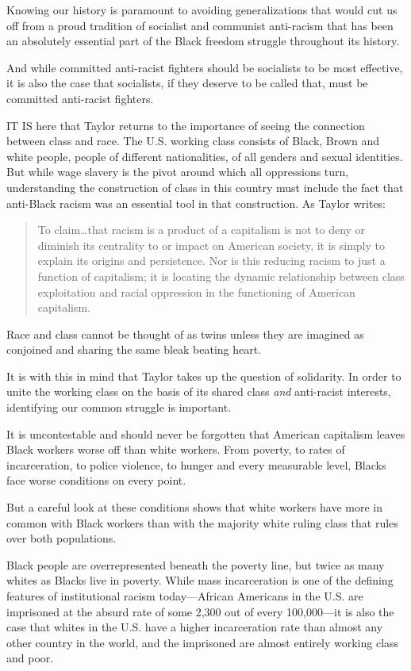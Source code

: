 Knowing our history is paramount to avoiding generalizations that would cut us off from a proud tradition of socialist and communist anti-racism that has been an absolutely essential part of the Black freedom struggle throughout its history.

And while committed anti-racist fighters should be socialists to be most effective, it is also the case that socialists, if they deserve to be called that, must be committed anti-racist fighters.

\sectiondivider

IT IS here that Taylor returns to the importance of seeing the connection between class and race. The U.S. working class consists of Black, Brown and white people, people of different nationalities, of all genders and sexual identities. But while wage slavery is the pivot around which all oppressions turn, understanding the construction of class in this country must include the fact that anti-Black racism was an essential tool in that construction. As Taylor writes:

\blockquote{To claim\ldots that racism is a product of a capitalism is not to deny or diminish its centrality to or impact on American society, it is simply to explain its origins and persistence. Nor is this reducing racism to just a function of capitalism; it is locating the dynamic relationship between class exploitation and racial oppression in the functioning of American capitalism.}

Race and class cannot be thought of as twins unless they are imagined as conjoined and sharing the same bleak beating heart.

It is with this in mind that Taylor takes up the question of solidarity. In order to unite the working class on the basis of its shared class \emph{and} anti-racist interests, identifying our common struggle is important.

It is uncontestable and should never be forgotten that American capitalism leaves Black workers worse off than white workers. From poverty, to rates of incarceration, to police violence, to hunger and every measurable level, Blacks face worse conditions on every point.

But a careful look at these conditions shows that white workers have more in common with Black workers than with the majority white ruling class that rules over both populations.

Black people are overrepresented beneath the poverty line, but twice as many whites as Blacks live in poverty. While mass incarceration is one of the defining features of institutional racism today---African Americans in the U.S. are imprisoned at the absurd rate of some 2,300 out of every 100,000---it is also the case that whites in the U.S. have a higher incarceration rate than almost any other country in the world, and the imprisoned are almost entirely working class and poor.

